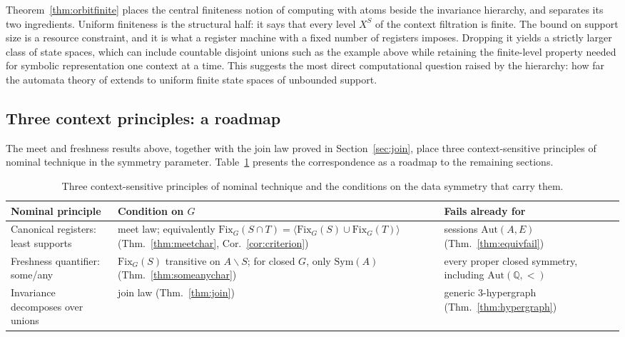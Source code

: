 \documentclass{lmcs}
\newcommand{\Sym}{\mathrm{Sym}}
\newcommand{\Fix}{\mathrm{Fix}}
\newcommand{\Aut}{\mathrm{Aut}}
\begin{document}
\begin{rem}\label{rem:orbitfinitereading}
Theorem~\ref{thm:orbitfinite} places the central finiteness notion of
computing with atoms beside the invariance hierarchy, and separates its
two ingredients. Uniform finiteness is the structural half: it says
that every level $X^S$ of the context filtration is finite. The bound on
support size is a resource constraint, and it is what a register machine
with a fixed number of registers imposes. Dropping it yields a strictly
larger class of state spaces, which can include countable disjoint
unions such as the example above while retaining the finite-level
property needed for symbolic representation one context at a time.
This suggests the most direct computational question raised by the
hierarchy: how far the automata theory of \cite{BKL14} extends to
uniform finite state spaces of unbounded support.
\end{rem}

\subsection{Three context principles: a roadmap}
\label{subsec:threeprinciples}

The meet and freshness results above, together with the join law proved
in Section~\ref{sec:join}, place three context-sensitive principles of
nominal technique in the symmetry parameter. Table~\ref{tab:principles}
presents the correspondence as a roadmap to the remaining sections.

\begin{table}[htbp]
\centering
\caption{Three context-sensitive principles of nominal technique and the
conditions on the data symmetry that carry them.}
\label{tab:principles}
\footnotesize
\begin{tabular}{@{}>{\raggedright\arraybackslash}p{4.3cm}>{\raggedright\arraybackslash}p{4.9cm}>{\raggedright\arraybackslash}p{3.6cm}@{}}
\toprule
Nominal principle & Condition on $G$ & Fails already for\\
\midrule
Canonical registers: least supports & meet law; equivalently
$\Fix_G(S\cap T)=\langle\Fix_G(S)\cup\Fix_G(T)\rangle$
(Thm.~\ref{thm:meetchar}, Cor.~\ref{cor:criterion}) & sessions
$\Aut(A,E)$ (Thm.~\ref{thm:equivfail})\\[2pt]
Freshness quantifier: \textsf{some/any} & $\Fix_G(S)$ transitive on
$A\smallsetminus S$; for closed $G$, only $\Sym(A)$
(Thm.~\ref{thm:someanychar}) & every proper closed symmetry, including
$\Aut(\mathbb Q,<)$\\[2pt]
Invariance decomposes over unions & join law
(Thm.~\ref{thm:join}) & generic $3$-hypergraph
(Thm.~\ref{thm:hypergraph})\\
\bottomrule
\end{tabular}
\end{table}
\end{document}
